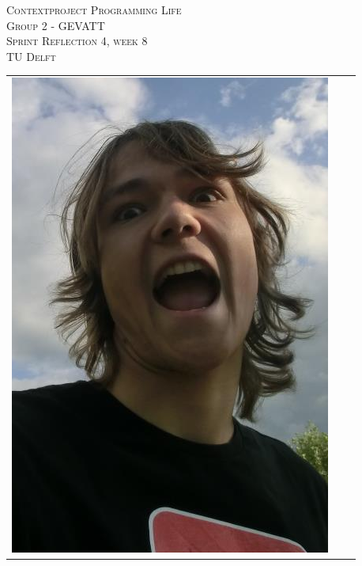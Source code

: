 \begin{titlepage}
\begin{center}
\textsc{\LARGE Contextproject Programming Life}\\
\vspace{10pt}
\textsc{\LARGE Group 2 - GEVATT}\\
\vspace{10pt}
\textsc{\LARGE Sprint Reflection 4, week 8}\\
\vspace{10pt}
\textsc{\large TU Delft}

\begin{table}[ht]
\centering
\begin{tabular}{ccc}
\includegraphics[scale=0.2]{../photos/ruben.png}   &

\end{tabular}
\end{table}
\end{center}
\end{titlepage}

